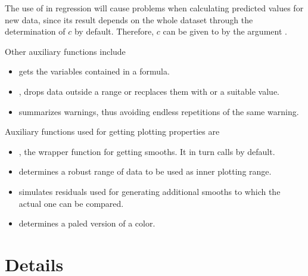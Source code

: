 \documentclass[11pt]{article}\usepackage[]{graphicx}\usepackage[]{color}
\begin{document}
The use of  in regression will cause problems when calculating
predicted values for new data, since its result depends on the whole
dataset through the determination of $c$ by default. 
Therefore, $c$ can be given to  by the argument .

Other auxiliary functions include
\begin{itemize}
\item
   gets the variables contained in a formula.
\item 
  , drops data outside a range or recplaces them with 
  or a suitable value.
\item
   summarizes warnings, thus avoiding endless repetitions of the
  same warning.
\end{itemize}

Auxiliary functions used for getting plotting properties are
\begin{itemize}
\item
  , the wrapper function for getting smooths.
  It in turn calls  by default.
\item 
   determines a robust range of data to be used as inner
  plotting range.
\item
   simulates residuals used for generating additional
  smooths to which the actual one can be compared.
\item
   determines a paled version of a color.
\end{itemize}



\section{Details}

\end{document}
